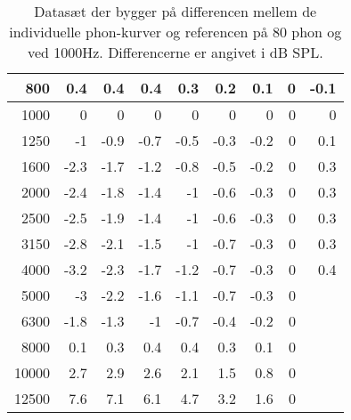 \begin{table}[H]
{\begin{tabular}{|r|r|r|r|r|r|r|r|r|}
800 & 0.4 & 0.4 & 0.4 & 0.3 & 0.2 & 0.1 & 0 & -0.1 \\ \hline
1000 & 0 & 0 & 0 & 0 & 0 & 0 & 0 & 0 \\ \hline
1250 & -1 & -0.9 & -0.7 & -0.5 & -0.3 & -0.2 & 0 & 0.1 \\ \hline
1600 & -2.3 & -1.7 & -1.2 & -0.8 & -0.5 & -0.2 & 0 & 0.3 \\ \hline
2000 & -2.4 & -1.8 & -1.4 & -1 & -0.6 & -0.3 & 0 & 0.3 \\ \hline
2500 & -2.5 & -1.9 & -1.4 & -1 & -0.6 & -0.3 & 0 & 0.3 \\ \hline
3150 & -2.8 & -2.1 & -1.5 & -1 & -0.7 & -0.3 & 0 & 0.3 \\ \hline
4000 & -3.2 & -2.3 & -1.7 & -1.2 & -0.7 & -0.3 & 0 & 0.4 \\ \hline
5000 & -3 & -2.2 & -1.6 & -1.1 & -0.7 & -0.3 & 0 &  \\ \hline
6300 & -1.8 & -1.3 & -1 & -0.7 & -0.4 & -0.2 & 0 &  \\ \hline
8000 & 0.1 & 0.3 & 0.4 & 0.4 & 0.3 & 0.1 & 0 &  \\ \hline
10000 & 2.7 & 2.9 & 2.6 & 2.1 & 1.5 & 0.8 & 0 &  \\ \hline
12500 & 7.6 & 7.1 & 6.1 & 4.7 & 3.2 & 1.6 & 0 &  \\ \hline
\end{tabular}%
}
\caption{Datasæt der bygger på differencen mellem de individuelle phon-kurver og referencen på 80 phon og ved 1000Hz. Differencerne er angivet i dB SPL.}
\label{tab:ISO226Difference}
\end{table}